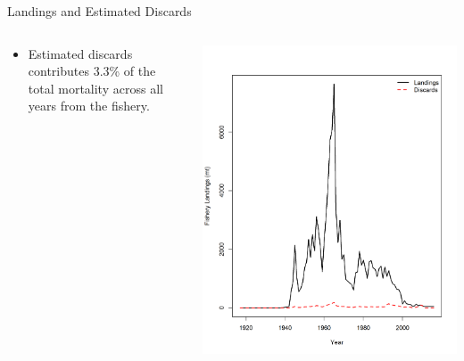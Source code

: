 \documentclass[pdf]{beamer}\usepackage[]{graphicx}\usepackage[]{color}
\begin{document}
\begin{frame}{Landings and Estimated Discards}
\begin{columns}
  \begin{column}{0.4\textwidth}
    \begin{itemize}
      \item Estimated discards contributes 3.3\% of the total mortality across all years from the fishery.
    \end{itemize}
  \end{column}
  
  \begin{column}{0.6\textwidth}
  \begin{center}
    \includegraphics[scale = 0.33]{figures/POP_Landings_Discards.png}
  \end{center}
  \end{column}
\end{columns}
\end{frame}
\end{document}
